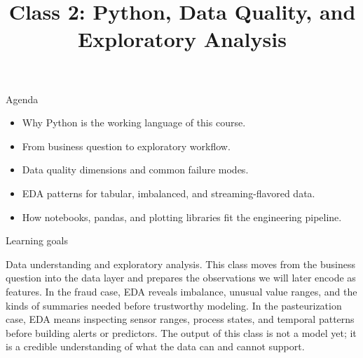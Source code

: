 

\title{Class 2: Python, Data Quality, and Exploratory Analysis}
\author{\coursename}
\date{}



\frame{\titlepage \coursefooter}

\begin{frame}{Agenda}
\begin{itemize}
\item Why Python is the working language of this course.
\item From business question to exploratory workflow.
\item Data quality dimensions and common failure modes.
\item EDA patterns for tabular, imbalanced, and streaming-flavored data.
\item How notebooks, pandas, and plotting libraries fit the engineering pipeline.
\end{itemize}
\coursefooter
\end{frame}

\begin{frame}{Learning goals}
\coursefooter
\end{frame}

\coursecontextframe
{Data understanding and exploratory analysis.}
{This class moves from the business question into the data layer and prepares the observations we will later encode as features.}
{In the fraud case, EDA reveals imbalance, unusual value ranges, and the kinds of summaries needed before trustworthy modeling.}
{In the pasteurization case, EDA means inspecting sensor ranges, process states, and temporal patterns before building alerts or predictors.}
{The output of this class is not a model yet; it is a credible understanding of what the data can and cannot support.}

